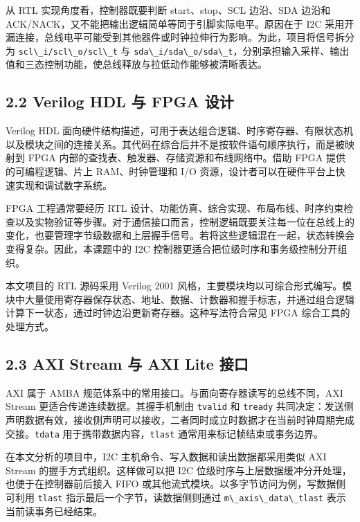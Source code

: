从 RTL 实现角度看，控制器既要判断 start、stop、SCL 边沿、SDA 边沿和
ACK/NACK，又不能把输出逻辑简单等同于引脚实际电平。原因在于 I2C
采用开漏连接，总线电平可能受到其他器件或时钟拉伸行为影响。为此，项目将信号拆分为
\passthrough{\lstinline!scl\_i/scl\_o/scl\_t!} 与
\passthrough{\lstinline!sda\_i/sda\_o/sda\_t!}，分别承担输入采样、输出值和三态控制功能，使总线释放与拉低动作能够被清晰表达。

\subsection{2.2 Verilog HDL 与 FPGA
设计}\label{verilog-hdl-ux4e0e-fpga-ux8bbeux8ba1}

Verilog HDL
面向硬件结构描述，可用于表达组合逻辑、时序寄存器、有限状态机以及模块之间的连接关系。其代码在综合后并不是按软件语句顺序执行，而是被映射到
FPGA 内部的查找表、触发器、存储资源和布线网络中。借助 FPGA
提供的可编程逻辑、片上 RAM、时钟管理和 I/O
资源，设计者可以在硬件平台上快速实现和调试数字系统。

FPGA 工程通常要经历 RTL
设计、功能仿真、综合实现、布局布线、时序约束检查以及实物验证等步骤。对于通信接口而言，控制逻辑既要关注每一位在总线上的变化，也要管理字节级数据和上层握手信号。若将这些逻辑混在一起，状态转换会变得复杂。因此，本课题中的
I2C 控制器更适合把位级时序和事务级控制分开组织。

本文项目的 RTL 源码采用 Verilog 2001
风格，主要模块均以可综合形式编写。模块中大量使用寄存器保存状态、地址、数据、计数器和握手标志，并通过组合逻辑计算下一状态，通过时钟边沿更新寄存器。这种写法符合常见
FPGA 综合工具的处理方式。

\subsection{2.3 AXI Stream 与 AXI Lite
接口}\label{axi-stream-ux4e0e-axi-lite-ux63a5ux53e3}

AXI 属于 AMBA 规范体系中的常用接口。与面向寄存器读写的总线不同，AXI
Stream 更适合传递连续数据。其握手机制由 \passthrough{\lstinline!tvalid!}
和 \passthrough{\lstinline!tready!}
共同决定：发送侧声明数据有效，接收侧声明可以接收，二者同时成立时数据才在当前时钟周期完成交接。\passthrough{\lstinline!tdata!}
用于携带数据内容，\passthrough{\lstinline!tlast!}
通常用来标记帧结束或事务边界。

在本文分析的项目中，I2C 主机命令、写入数据和读出数据都采用类似 AXI
Stream 的握手方式组织。这样做可以把 I2C
位级时序与上层数据缓冲分开处理，也便于在控制器前后接入 FIFO
或其他流式模块。以多字节访问为例，写数据侧可利用
\passthrough{\lstinline!tlast!} 指示最后一个字节，读数据侧则通过
\passthrough{\lstinline!m\_axis\_data\_tlast!} 表示当前读事务已经结束。

